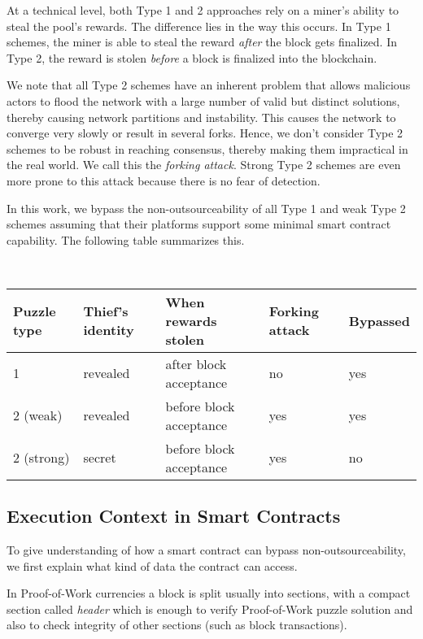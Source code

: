 \documentclass[runningheads]{llncs}
\begin{document}
At a technical level, both Type 1 and 2 approaches rely on a miner's ability to steal the pool's rewards. The difference lies in the way this occurs. In Type 1 schemes, the miner is able to steal the reward {\em after} the block gets finalized.
In Type 2, 
the reward is stolen {\em before} a block is finalized into the blockchain. 


We note that all Type 2 schemes have an inherent problem that allows malicious actors to flood the network with a large number of valid but distinct solutions, thereby causing network partitions and instability. This causes the network to converge very slowly or result in several forks. Hence, we don't consider Type 2 schemes to be robust in reaching consensus, thereby making them impractical in the real world. We call this the {\em forking attack}. Strong Type 2 schemes are even more prone to this attack because there is no fear of detection. %

In this work, we bypass the non-outsourceability of all Type 1 and weak Type 2 schemes assuming that their platforms support
some minimal smart contract capability. The following table summarizes this. 

~\\
	\begin{tabular}{|l|l|l|l|l|}\hline
		  Puzzle type     & Thief's identity   & When rewards stolen       & Forking attack &Bypassed \\\hline
		  1        & revealed              & after block acceptance   & no & yes             \\
		  2 (weak)   & revealed           & before block acceptance  & yes &yes            \\
		  2 (strong) & secret           & before block acceptance  & yes & no      \\\hline
	\end{tabular}

\subsection{Execution Context in Smart Contracts}
\label{context}

To give understanding of how a smart contract can bypass non-outsourceability, we first explain what kind of data the contract 
can access.

In Proof-of-Work currencies a block is split usually into sections, with a compact section called {\em header} which is
enough to verify Proof-of-Work puzzle solution and also to check integrity of other sections (such as block transactions).
\end{document}
